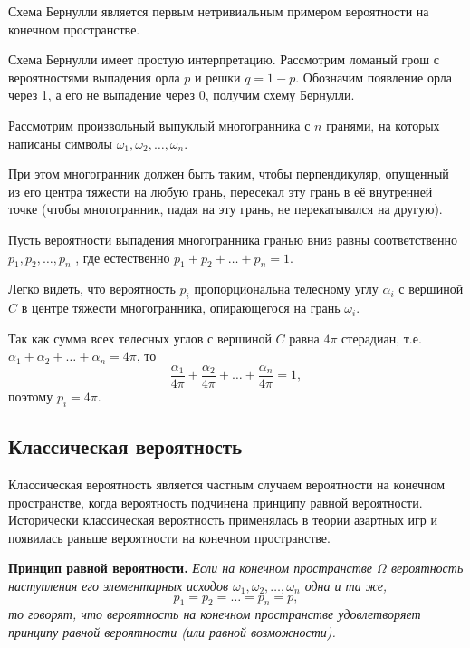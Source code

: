 Схема Бернулли является первым нетривиальным примером вероятности на конечном пространстве.

Схема Бернулли имеет простую интерпретацию. Рассмотрим ломаный грош с вероятностями выпадения орла $p$ и решки $q = 1 − p$. Обозначим появление орла через 1, а его не выпадение через 0, получим схему Бернулли.

\begin{example}
Рассмотрим произвольный выпуклый многогранника с $n$ гранями, на которых написаны символы $\omega_1 , \omega_2 , \ldots , \omega_n$.

При этом многогранник должен быть таким, чтобы перпендикуляр, опущенный из его центра тяжести на любую грань, пересекал эту грань в её внутренней точке (чтобы многогранник, падая на эту грань, не перекатывался на другую).

Пусть вероятности выпадения многогранника гранью вниз равны соответственно $p_1 , p_2 , \ldots , p_n$ , где естественно $p_1 + p_2 + \ldots +p_n = 1$. 

Легко видеть, что вероятность $p_i$ пропорциональна телесному углу $\alpha_i$ с вершиной $C$ в центре тяжести многогранника, опирающегося на грань $\omega_i$.

Так как сумма всех телесных углов с вершиной $C$ равна $4\pi$ стерадиан, т.е. $\alpha_1 + \alpha_2 + \ldots + \alpha_n = 4\pi$, то
$$\frac{\alpha_1}{4\pi} + \frac{\alpha_2}{4\pi} + \ldots + \frac{\alpha_n}{4\pi}
 = 1,$$ поэтому $p_i = 4\pi$.
\end{example}

\subsection{Классическая вероятность}

Классическая вероятность является частным случаем вероятности на конечном пространстве, когда вероятность подчинена принципу равной вероятности. Исторически классическая вероятность применялась в теории азартных игр и появилась раньше вероятности на конечном пространстве.

\textbf{Принцип равной вероятности.} \textit{Если на конечном пространстве $\Omega$ вероятность наступления его элементарных исходов $\omega_1 , \omega_2 , \ldots , \omega_n$ одна и та же,
$$p_1 = p_2 = \ldots = p_n = p,$$
то говорят, что вероятность на конечном пространстве удовлетворяет
принципу равной вероятности (или равной возможности).}

